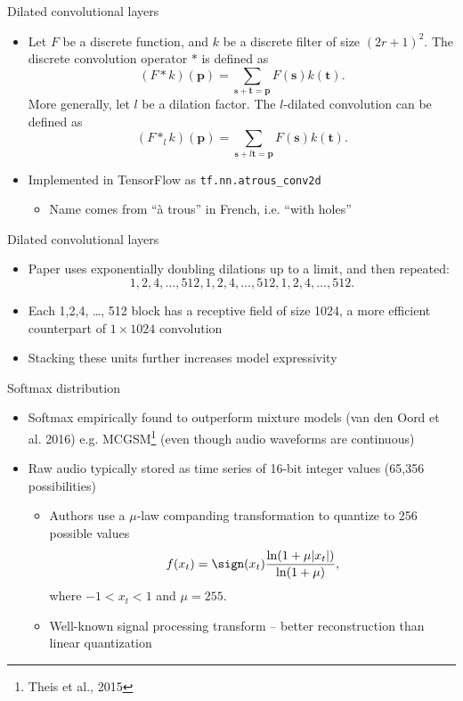 \documentclass{beamer}
\begin{document}
  \begin{frame}{Dilated convolutional layers}
    \begin{itemize}
      \item Let $F$ be a discrete function, and $k$ be a discrete filter of size $(2r+1)^2$.  The discrete convolution operator $*$ is defined as
        \[
          (F * k)(\mathbf{p}) = \sum_{\mathbf{s+t=p}} F(\mathbf{s}) k(\mathbf{t}).
        \]
        More generally, let $l$ be a dilation factor.  The $l$-dilated convolution can be defined as
        \[
          (F *_l k)(\mathbf{p}) = \sum_{\mathbf{s}+l\mathbf{t=p}} F(\mathbf{s}) k(\mathbf{t}).
        \]
      \item Implemented in TensorFlow as \texttt{tf.nn.atrous\_conv2d}
        \begin{itemize}
          \item Name comes from ``\`{a} trous'' in French, i.e. ``with holes''
        \end{itemize}
    \end{itemize}
  \end{frame}

  \begin{frame}{Dilated convolutional layers}
    \begin{itemize}
    \item Paper uses exponentially doubling dilations up to a limit, and then repeated:
      \[
        1,2,4,\dots,512,1,2,4,\dots,512,1,2,4,\dots,512.
      \]
     \item Each 1,2,4, \dots, 512 block has a receptive field of size 1024, a more efficient counterpart of $1 \times 1024$ convolution
      \item Stacking these units further increases model expressivity
    \end{itemize}
  \end{frame}

  \begin{frame}{Softmax distribution}
    \begin{itemize}
      \item Softmax empirically found to outperform mixture models (van den Oord et al. 2016) e.g. MCGSM\footnote{Theis et al., 2015} (even though audio waveforms are continuous)
      \item Raw audio typically stored as time series of 16-bit integer values (65,356 possibilities)
          \begin{itemize}
            \item Authors use a $\mu$-law companding transformation to quantize to 256 possible values
              \[
                f(x_t) = \sign(x_t) \frac{\ln(1 + \mu |x_t|)}{\ln (1 + \mu)},
              \]
              where $-1 < x_t < 1$ and $\mu = 255$.
            \item Well-known signal processing transform -- better reconstruction than linear quantization
          \end{itemize}
    \end{itemize}
  \end{frame}
\end{document}
